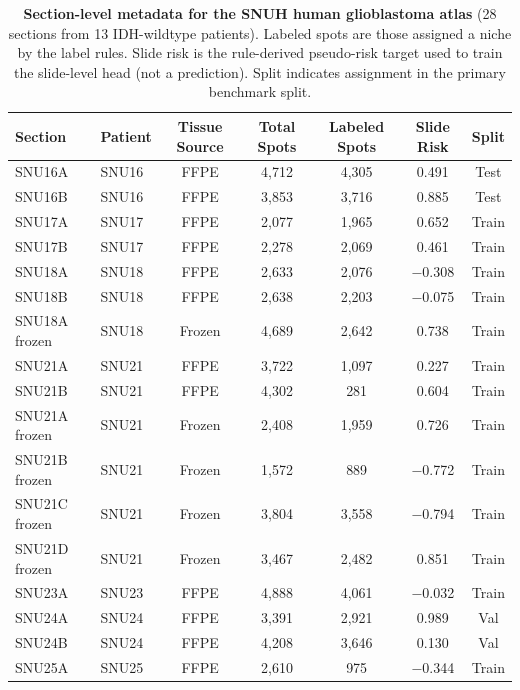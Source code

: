\documentclass[11pt,letterpaper]{article}
\begin{document}
\begin{table}[H]
\centering
\caption{\textbf{Section-level metadata for the SNUH human glioblastoma atlas} (28 sections from 13 IDH-wildtype patients). Labeled spots are those assigned a niche by the label rules. Slide risk is the rule-derived pseudo-risk target used to train the slide-level head (not a prediction). Split indicates assignment in the primary benchmark split.}
\label{tab:s2}
\footnotesize
\setlength{\tabcolsep}{4.5pt}
\begin{tabular}{llccccc}
\toprule
\textbf{Section} & \textbf{Patient} & \textbf{Tissue Source} & \textbf{Total Spots} & \textbf{Labeled Spots} & \textbf{Slide Risk} & \textbf{Split} \\
\midrule
SNU16A         & SNU16   & FFPE   & 4{,}712 & 4{,}305 & 0.491  & Test \\
SNU16B         & SNU16   & FFPE   & 3{,}853 & 3{,}716 & 0.885  & Test \\
SNU17A         & SNU17   & FFPE   & 2{,}077 & 1{,}965 & 0.652  & Train \\
SNU17B         & SNU17   & FFPE   & 2{,}278 & 2{,}069 & 0.461  & Train \\
SNU18A         & SNU18   & FFPE   & 2{,}633 & 2{,}076 & $-$0.308 & Train \\
SNU18B         & SNU18   & FFPE   & 2{,}638 & 2{,}203 & $-$0.075 & Train \\
SNU18A frozen  & SNU18   & Frozen & 4{,}689 & 2{,}642 & 0.738  & Train \\
SNU21A         & SNU21   & FFPE   & 3{,}722 & 1{,}097 & 0.227  & Train \\
SNU21B         & SNU21   & FFPE   & 4{,}302 & 281     & 0.604  & Train \\
SNU21A frozen  & SNU21   & Frozen & 2{,}408 & 1{,}959 & 0.726  & Train \\
SNU21B frozen  & SNU21   & Frozen & 1{,}572 & 889     & $-$0.772 & Train \\
SNU21C frozen  & SNU21   & Frozen & 3{,}804 & 3{,}558 & $-$0.794 & Train \\
SNU21D frozen  & SNU21   & Frozen & 3{,}467 & 2{,}482 & 0.851  & Train \\
SNU23A         & SNU23   & FFPE   & 4{,}888 & 4{,}061 & $-$0.032 & Train \\
SNU24A         & SNU24   & FFPE   & 3{,}391 & 2{,}921 & 0.989  & Val \\
SNU24B         & SNU24   & FFPE   & 4{,}208 & 3{,}646 & 0.130  & Val \\
SNU25A         & SNU25   & FFPE   & 2{,}610 & 975     & $-$0.344 & Train \\

\end{tabular}
\end{table}
\end{document}

